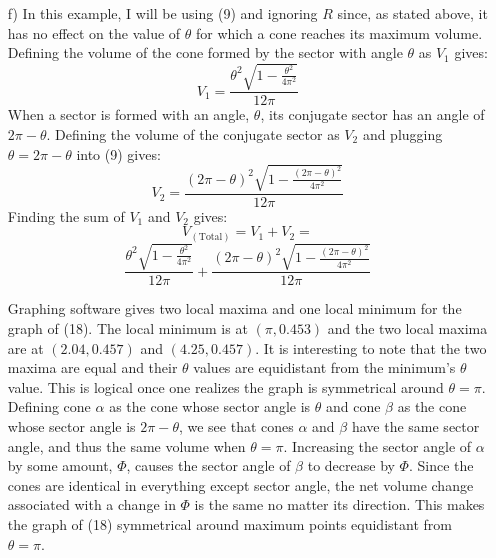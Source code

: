 \documentclass{article}
\begin{document}
\begin{itemize}
    \item[f)]
    In this example, I will be using (9) and ignoring \(R\) since, as stated above, it has no effect on the value of \(\theta\) for which a cone reaches its maximum volume. Defining the volume of the cone formed by the sector with angle \(\theta\) as \(V_1\) gives:
    \begin{equation}
        V_1=\frac{\theta^2\sqrt{1-\frac{\theta^2}{4\pi^2}}}{12\pi}
    \end{equation}
    When a sector is formed with an angle, \(\theta\), its conjugate sector has an angle of \(2\pi-\theta\). Defining the volume of the conjugate sector as \(V_2\) and plugging \(\theta=2\pi-\theta\) into (9) gives: 
    \begin{equation}
        V_2=\frac{(2\pi-\theta)^2\sqrt{1-\frac{(2\pi-\theta)^2}{4\pi^2}}}{12\pi}
    \end{equation}
    Finding the sum of \(V_1\) and \(V_2\) gives:
        \[V_{\left(\mbox{Total}\right)}=V_1+V_2=\]
        \begin{equation}
            \frac{\theta^2\sqrt{1-\frac{\theta^2}{4\pi^2}}}{12\pi}+\frac{(2\pi-\theta)^2\sqrt{1-\frac{(2\pi-\theta)^2}{4\pi^2}}}{12\pi}
        \end{equation}
    
    Graphing software gives two local maxima and one local minimum for the graph of (18). The local minimum is at \((\pi, 0.453)\) and the two local maxima are at \((2.04,0.457)\) and \((4.25,0.457)\). It is interesting to note that the two maxima are equal and their \(\theta\) values are equidistant from the minimum's \(\theta\) value. This is logical once one realizes the graph is symmetrical around \(\theta=\pi\). Defining cone \(\alpha\) as the cone whose sector angle is \(\theta\) and cone \(\beta\) as the cone whose sector angle is \(2\pi-\theta\), we see that cones \(\alpha\) and \(\beta\) have the same sector angle, and thus the same volume when \(\theta=\pi\). Increasing the sector angle of \(\alpha\) by some amount, \(\Phi\), causes the sector angle of \(\beta\) to decrease by \(\Phi\). Since the cones are identical in everything except sector angle, the net volume change associated with a change in \(\Phi\) is the same no matter its direction. This makes the graph of (18) symmetrical around maximum points equidistant from \(\theta=\pi\).
    
\end{itemize}
\end{document}
